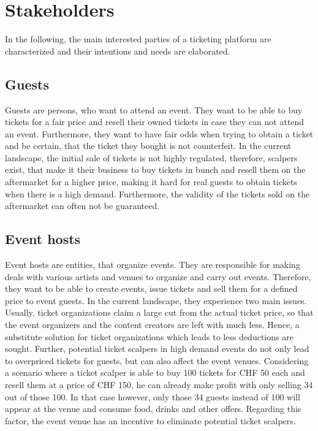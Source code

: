 \section{Stakeholders}\label{chapter:introduction:Stakeholder}
In the following, the main interested parties of a ticketing platform are characterized and their intentions and needs are elaborated.

\subsection{Guests}
Guests are persons, who want to attend an event. They want to be able to buy tickets for a fair price and resell their owned tickets in case they can not attend an event. Furthermore, they want to have fair odds when trying to obtain a ticket and be certain, that the ticket they bought is not counterfeit. In the current landscape, the initial sale of tickets is not highly regulated, therefore, scalpers exist, that make it their business to buy tickets in bunch and resell them on the aftermarket for a higher price, making it hard for real guests to obtain tickets when there is a high demand. Furthermore, the validity of the tickets sold on the aftermarket can often not be guaranteed.

\subsection{Event hosts}\label{chapter:introduction:Stakeholder:EventHost}
Event hosts are entities, that organize events. They are responsible for making deals with various artists and venues to organize and carry out events. Therefore, they want to be able to create events, issue tickets and sell them for a defined price to event guests. In the current landscape, they experience two main issues. Usually, ticket organizations claim a large cut from the actual ticket price, so that the event organizers and the content creators are left with much less. Hence, a substitute solution for ticket organizations which leads to less deductions are sought. Further, potential ticket scalpers in high demand events do not only lead to overpriced tickets for guests, but can also affect the event venues. Considering a scenario where a ticket scalper is able to buy 100 tickets for CHF 50 each and resell them at a price of CHF 150, he can already make profit with only selling 34 out of those 100. In that case however, only those 34 guests instead of 100 will appear at the venue and consume food, drinks and other offers. Regarding this factor, the event venue has an incentive to eliminate potential ticket scalpers.

